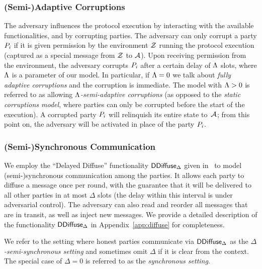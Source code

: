 \subsubsection{(Semi-)Adaptive Corruptions}
\label{sec:prelim-corr}

The adversary  influences the protocol execution by interacting
with the available functionalities, and by corrupting parties.
The adversary can only corrupt a party $P_i$ if it is given
permission by the environment $\mathcal{Z}$ running the protocol execution (captured as
a special message from $\mathcal{Z}$ to $\mathcal{A}$).
Upon receiving permission from the environment, the adversary
corrupts $P_i$ after a certain delay of $\Lambda$ slots, where $\Lambda$ is
a parameter of our model. In particular, if $\Lambda=0$ we talk about
\emph{fully adaptive corruptions} and the corruption is immediate.
The model with $\Lambda>0$ is
referred to as allowing \emph{$\Lambda$-semi-adaptive corruptions} (as opposed to the
\emph{static corruptions model}, where parties can only be corrupted before the
start of the execution).
%
A corrupted
party $P_i$ will relinquish its entire state to~$\mathcal{A}$;
from this point on, the adversary will be activated in place of the
party $P_i$.

\subsubsection{(Semi-)Synchronous Communication}
\label{sec:prelim-comm}

We employ the ``Delayed Diffuse'' functionality $\mathsf{DDiffuse}_\Delta$ given in~\cite{praos} to
model (semi-)synchronous communication among the parties. It allows each party
to diffuse a message once per round, with the guarantee that it will be
delivered to all other parties in at most $\Delta$ slots (the delay within this
interval is under adversarial control). The adversary can also read and reorder
all messages that are in transit, as well as inject new messages.
We provide a detailed description of the functionality $\mathsf{DDiffuse}_\Delta$ in
Appendix~\ref{app:diffuse} for completeness.

We refer to the setting where honest parties communicate via $\mathsf{DDiffuse}_\Delta$
as the \emph{$\Delta$-semi-synchronous setting} and sometimes omit $\Delta$ if
it is clear from the context. The special case of $\Delta=0$ is referred to as
the \emph{synchronous setting}.

